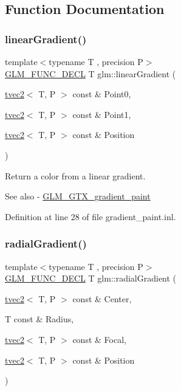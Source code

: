 \subsection{Function Documentation}
\mbox{\label{group__gtx__gradient__paint_gacde26d5e0c4a1856467bded9dfad9040}} 
\subsubsection{\texorpdfstring{linearGradient()}{linearGradient()}}
{\footnotesize\ttfamily template$<$typename T , precision P$>$ \\
\mbox{\hyperlink{setup_8hpp_ab2d052de21a70539923e9bcbf6e83a51}{G\+L\+M\+\_\+\+F\+U\+N\+C\+\_\+\+D\+E\+CL}} T glm\+::linear\+Gradient (\begin{DoxyParamCaption}\item[{\mbox{\hyperlink{structglm_1_1tvec2}{tvec2}}$<$ T, P $>$ const \&}]{Point0,  }\item[{\mbox{\hyperlink{structglm_1_1tvec2}{tvec2}}$<$ T, P $>$ const \&}]{Point1,  }\item[{\mbox{\hyperlink{structglm_1_1tvec2}{tvec2}}$<$ T, P $>$ const \&}]{Position }\end{DoxyParamCaption})}

Return a color from a linear gradient. \begin{DoxySeeAlso}{See also}
-\/ \mbox{\hyperlink{group__gtx__gradient__paint}{G\+L\+M\+\_\+\+G\+T\+X\+\_\+gradient\+\_\+paint}} 
\end{DoxySeeAlso}


Definition at line 28 of file gradient\+\_\+paint.\+inl.

\mbox{\label{group__gtx__gradient__paint_ga166d43d567a4cf150579a92f69b0dc9f}} 
\subsubsection{\texorpdfstring{radialGradient()}{radialGradient()}}
{\footnotesize\ttfamily template$<$typename T , precision P$>$ \\
\mbox{\hyperlink{setup_8hpp_ab2d052de21a70539923e9bcbf6e83a51}{G\+L\+M\+\_\+\+F\+U\+N\+C\+\_\+\+D\+E\+CL}} T glm\+::radial\+Gradient (\begin{DoxyParamCaption}\item[{\mbox{\hyperlink{structglm_1_1tvec2}{tvec2}}$<$ T, P $>$ const \&}]{Center,  }\item[{T const \&}]{Radius,  }\item[{\mbox{\hyperlink{structglm_1_1tvec2}{tvec2}}$<$ T, P $>$ const \&}]{Focal,  }\item[{\mbox{\hyperlink{structglm_1_1tvec2}{tvec2}}$<$ T, P $>$ const \&}]{Position }\end{DoxyParamCaption})}

